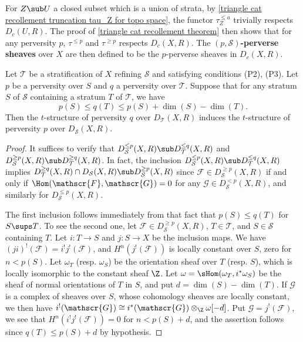For $Z\sub U$ a closed subset which is a union of strata, by \cref{triangle cat recollement truncation tau_Z for topo space}, the functor $\tau^{\leq a}_Z$ trivially respects $D_c(U,R)$. The proof of \cref{triangle cat recollement theorem} then shows that for any perversity $p$, $\tau^{\leq p}$ and $\tau^{\geq p}$ respects $D_c(X,R)$. The \textbf{$(p,\mathcal{S})$-perverse sheaves} over $X$ are then defined to be the $p$-perverse sheaves in $D_c(X,R)$.\par

\begin{proposition}\label{stratified space constructible perverse structure refinement}
Let $\mathcal{T}$ be a stratification of $X$ refining $\mathcal{S}$ and satisfying conditions (P2), (P3). Let $p$ be a perversity over $S$ and $q$ a perversity over $\mathcal{T}$. Suppose that for any stratum $S$ of $\mathcal{S}$ containing a stratum $T$ of $\mathcal{T}$, we have
\[p(S)\leq q(T)\leq p(S)+\dim(S)-\dim(T).\]
Then the $t$-structure of perversity $q$ over $D_\mathcal{T}(X,R)$ induces the $t$-structure of perversity $p$ over $D_\mathcal{S}(X,R)$.
\end{proposition}
\begin{proof}
It suffices to verify that $D_\mathcal{S}^{\leq p}(X,R)\sub D_\mathcal{T}^{\leq q}(X,R)$ and $D_\mathcal{S}^{\geq p}(X,R)\sub D_\mathcal{T}^{\geq q}(X,R)$. In fact, the inclusion $D_\mathcal{S}^{\leq p}(X,R)\sub D_\mathcal{T}^{\leq q}(X,R)$ implies $D_\mathcal{T}^{\geq q}(X,R)\cap D_\mathcal{S}(X,R)\sub D_\mathcal{S}^{\geq p}(X,R)$ since $\mathscr{F}\in D_\mathcal{S}^{\geq p}(X,R)$ if and only if $\Hom(\mathscr{F},\mathscr{G})=0$ for any $\mathscr{G}\in D_\mathcal{S}^{<p}(X,R)$, and similarly for $D_\mathcal{S}^{\leq p}(X,R)$.\par
The first inclusion follows immediately from that fact that $p(S)\leq q(T)$ for $S\sups T$. To see the second one, let $\mathscr{F}\in D_\mathcal{S}^{\geq p}(X,R)$, $T\in\mathcal{T}$, and $S\in\mathcal{S}$ containing $T$. Let $i:T\to S$ and $j:S\to X$ be the inclusion maps. We have $(ji)^!(\mathscr{F})=i^!j^!(\mathscr{F})$, and $H^n(j^!(\mathscr{F}))$ is locally constant over $S$, zero for $n<p(S)$. Let $\omega_T$ (resp. $\omega_S$) be the orientation sheaf over $T$ (resp. $S$), which is locally isomorphic to the constant sheaf $\Z$. Let $\omega=\sHom(\omega_T,i^*\omega_S)$ be the sheaf of normal orientations of $T$ in $S$, and put $d=\dim(S)-\dim(T)$. If $\mathscr{G}$ is a complex of sheaves over $S$, whose cohomology sheaves are locally constant, we then have $i^!(\mathscr{G})\cong i^*(\mathscr{G})\otimes_{\Z}\omega[-d]$. Put $\mathscr{G}=j^!(\mathscr{F})$, we see that $H^n(i^!j^!(\mathscr{F}))=0$ for $n<p(S)+d$, and the assertion follows since $q(T)\leq p(S)+d$ by hypothesis.
\end{proof}

